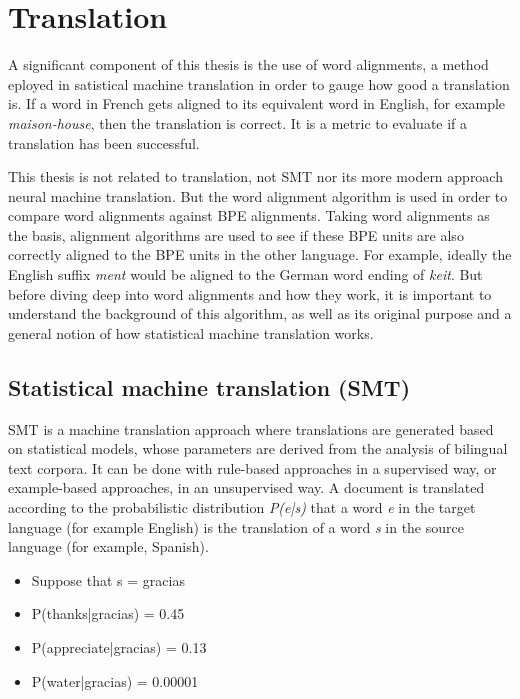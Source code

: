 %
%

\chapter{Translation}\label{ch:translation}

A significant component of this thesis is the use of word alignments, a method eployed in satistical machine translation in order to gauge how good a translation is. If a word in French gets aligned to its equivalent word in English, for example \emph{maison-house}, then the translation is correct. It is a metric to evaluate if a translation has been successful.

This thesis is not related to translation, not SMT nor its more modern approach neural machine translation. But the word alignment algorithm is used in order to compare word alignments against BPE alignments. Taking word alignments as the basis, alignment algorithms are used to see if these BPE units are also correctly aligned to the BPE units in the other language. For example, ideally the English suffix \emph{ment} would be aligned to the German word ending of \emph{keit}. But before diving deep into word alignments and how they work, it is important to understand the background of this algorithm, as well as its original purpose and a general notion of how statistical machine translation works.

\section{Statistical machine translation (SMT)}

SMT is a machine translation approach where translations are generated based on statistical models, whose parameters are derived from the analysis of bilingual text corpora. It can be done with rule-based approaches in a supervised way, or example-based approaches, in an unsupervised way. A document is translated according to the probabilistic distribution \emph{P(e|s)} that a word \emph{e} in the target language (for example English) is the translation of a word \emph{s} in the source language (for example, Spanish).

\begin{itemize}
	\item Suppose that s = gracias
	\item P(thanks|gracias) = 0.45
	\item P(appreciate|gracias) = 0.13
	\item P(water|gracias) = 0.00001
\end{itemize}

